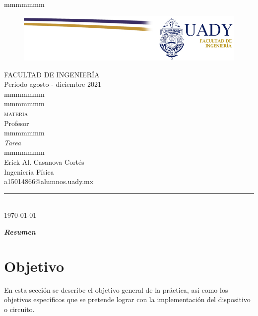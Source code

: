 \documentclass[letterpaper, 12pt]{article}
\begin{document}
\begin{center}
\begin{Large}
{\color{white} mmmmmmm} \bigskip\\
\begin{figure}[H]	
\centering
\includegraphics[scale=0.9]{bannerfiuady.png}
\end{figure}\bigskip
\textsc{FACULTAD DE INGENIERÍA}\bigskip\\
Periodo agosto - diciembre 2021 \bigskip\\
{\color{white} mmmmmmm} \\
{\color{white} mmmmmmm} \bigskip\\
\textsc{materia} \bigskip\\
Profesor \\
{\color{white} mmmmmmm} \bigskip\\
\textsl{Tarea } \bigskip\\
{\color{white} mmmmmmm} \bigskip\\
Erick Al. Casanova Cortés\\

\normalsize
Ingeniería Física\\
\small
a15014866@alumnos.uady.mx\\
\Large
\rule{0.5\paperwidth}{0.5pt} \\ \bigskip
{\AdvanceDate\today}
\end{Large}
\end{center}
\newpage


\setcounter{page}{1}
\tableofcontents
\listoffigures
\listoftables

\newpage
{}


\Large
\textit{ \textbf{Resumen}}
\normalsize

\section{Objetivo}
En esta sección se describe el objetivo general de la práctica, así como los objetivos específicos que se pretende lograr con la implementación del dispositivo o circuito.\\
\end{document}
